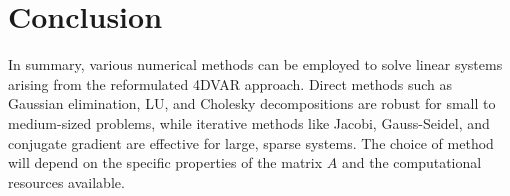 \documentclass{article}
\begin{document}
\section{Conclusion}
In summary, various numerical methods can be employed to solve linear systems arising from the reformulated 4DVAR approach. Direct methods such as Gaussian elimination, LU, and Cholesky decompositions are robust for small to medium-sized problems, while iterative methods like Jacobi, Gauss-Seidel, and conjugate gradient are effective for large, sparse systems. The choice of method will depend on the specific properties of the matrix \( A \) and the computational resources available.
\end{document}
